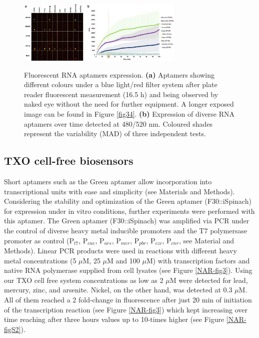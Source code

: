 \begin{figure}[ht]
\begin{center}
\includegraphics[height=140px, width=300px]{chapter2/chapter/figs/Imagen2.png}
\end{center}
\caption{Fluorescent RNA aptamers expression. \textbf{(a)} Aptamers showing different colours under a blue light/red filter system after plate reader fluorescent measurement (16.5 h) and being observed by naked eye without the need for further equipment. A longer exposed image can be found in Figure \ref{fig34}.
\textbf{(b)} Expression of diverse RNA aptamers over time detected at 480/520 nm. Coloured shades represent the variability (MAD) of three independent tests. }
\label{NAR-fig2}
\end{figure}

\subsection*{TXO cell-free biosensors}
Short aptamers such as the Green aptamer allow incorporation into transcriptional units with ease and simplicity (see Materials and Methods). Considering the stability and optimization of the Green aptamer (F30::iSpinach) for expression under in vitro conditions, further experiments were performed with this aptamer. The Green aptamer (F30::iSpinach) was amplified via PCR under the control of diverse heavy metal inducible promoters and the T7 polymersase promoter as control (P$_{t7}$, P$_{cue}$, P$_{ars}$, P$_{mer}$, P$_{pbr}$, P$_{czc}$, P$_{cnr}$, see Material and Methods). Linear PCR products were used in reactions with different heavy metal concentrations (5 $\mu$M, 25 $\mu$M and 100 $\mu$M) with transcription factors and native RNA polymerase supplied from cell lysates (see Figure \ref{NAR-fig3}). Using our TXO cell free system concentrations as low as 2 $\mu$M were detected for lead, mercury, zinc, and arsenite. Nickel, on the other hand, was detected at 0.3 $\mu$M. All of them reached a 2 fold-change in fluorescence after just 20 min of initiation of the transcription reaction (see Figure \ref{NAR-fig3}) which kept increasing over time reaching after three hours values up to 10-times higher (see Figure \ref{NAR-figS2}).

